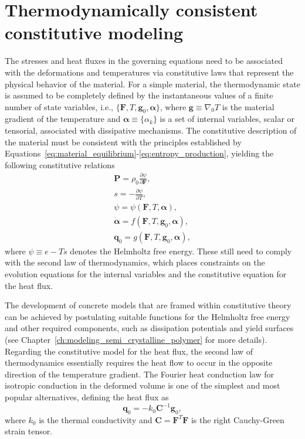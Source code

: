 \section{Thermodynamically consistent constitutive modeling} \label{sec:constitutive_modeling}
The stresses and heat fluxes in the governing equations need to be associated with the deformations and temperatures via constitutive laws that represent the physical behavior of the material.
For a simple material, the thermodynamic state is assumed to be completely defined by the instantaneous values of a finite number of state variables, i.e., \(\{\bm{F}, T, \bm{g}_0, \bm{\alpha}\}\), where $\bm g \equiv \nabla_0 T$ is the material gradient of the temperature and \(\bm{\alpha} \equiv \{\alpha_k\}\) is a set of internal variables, scalar or tensorial, associated with dissipative mechanisms.
The constitutive description of the material must be consistent with the principles established by Equations~\eqref{eq:material_equilibrium}-\eqref{eq:entropy_production}, yielding the following constitutive relations
\begin{gather}
  \bm{P} = \rho_0 \frac{\partial \psi}{\partial \bm{F}},\label{eq:constitutive_equation_stress_thermoelasticity}\\
  s = - \frac{\partial \psi}{\partial T},\\
  \psi = \psi(\bm{F},T, \bm{\alpha}),\label{eq:thermo_mech_helmholtz_free_energy}\\
  \dot{\bm{\alpha}} = f(\bm{F}, T, \bm{g}_0,\bm{\alpha}),\\
  \bm{q}_0 = g(\bm{F}, T, \bm{g}_0, \bm{\alpha}),
\end{gather}
where \(\psi \equiv e - T s\) denotes the Helmholtz free energy.
These still need to comply with the second law of thermodynamics, which places constraints on the evolution equations for the internal variables and the constitutive equation for the heat flux.

The development of concrete models that are framed within constitutive theory can be achieved by postulating suitable functions for the  Helmholtz free energy and other required components, such as dissipation potentials and yield surfaces (see Chapter~\ref{ch:modeling_semi_crystalline_polymer} for more details).
Regarding the constitutive model for the heat flux, the second law of thermodynamics essentially requires the heat flow to occur in the opposite direction of the temperature gradient.
The Fourier heat conduction law for isotropic conduction in the deformed volume is one of the simplest and most popular alternatives, defining the heat flux as
\begin{equation}
  \bm{q}_0 = - k_0 \bm{C}^{-1} \bm{g}_0,
\end{equation}
where \(k_0\) is the thermal conductivity and \(\bm{C} = \bm{F}^T \bm{F}\) is the right Cauchy-Green strain tensor.

